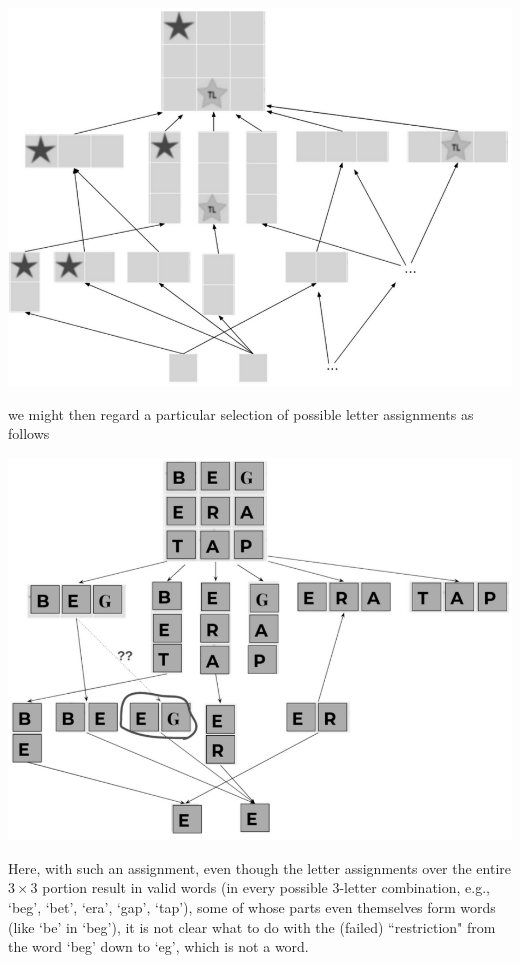 \documentclass[11pt]{book}
\theoremstyle{definition}
\theoremstyle{definition}
\theoremstyle{definition}
\theoremstyle{theorem}
\theoremstyle{definition}
\begin{document}
\begin{center}
	\includegraphics*[scale=0.23]{ScrabbleBoard.png}
\end{center}
we might then regard a particular selection of possible letter assignments as follows 
 \begin{center}
 	\includegraphics*[scale=0.23]{ScrabbleSheafAttempt.png}
 \end{center}
Here, with such an assignment, even though the letter assignments over the entire $3 \times 3$ portion result in valid words (in every possible 3-letter combination, e.g., `beg', `bet', `era', `gap', `tap'), some of whose parts even themselves form words (like `be' in `beg'), it is not clear what to do with the (failed) ``restriction" from the word `beg' down to `eg', which is not a word. 
\end{document}
